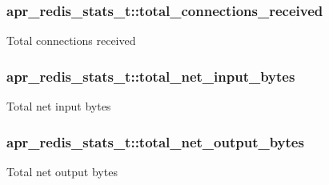\subsubsection[{\texorpdfstring{total\+\_\+connections\+\_\+received}{total_connections_received}}]{ apr\+\_\+redis\+\_\+stats\+\_\+t\+::total\+\_\+connections\+\_\+received}\hypertarget{structapr__redis__stats__t_aafa791ce198c906022489bb9f2b4726f}{}\label{structapr__redis__stats__t_aafa791ce198c906022489bb9f2b4726f}
Total connections received 
\subsubsection[{\texorpdfstring{total\+\_\+net\+\_\+input\+\_\+bytes}{total_net_input_bytes}}]{ apr\+\_\+redis\+\_\+stats\+\_\+t\+::total\+\_\+net\+\_\+input\+\_\+bytes}\hypertarget{structapr__redis__stats__t_ae558ddc0bd1c9b47623a17cb7a530eab}{}\label{structapr__redis__stats__t_ae558ddc0bd1c9b47623a17cb7a530eab}
Total net input bytes 
\subsubsection[{\texorpdfstring{total\+\_\+net\+\_\+output\+\_\+bytes}{total_net_output_bytes}}]{ apr\+\_\+redis\+\_\+stats\+\_\+t\+::total\+\_\+net\+\_\+output\+\_\+bytes}\hypertarget{structapr__redis__stats__t_ab9d64ab15cd5737af062eff6bed57c66}{}\label{structapr__redis__stats__t_ab9d64ab15cd5737af062eff6bed57c66}
Total net output bytes 
